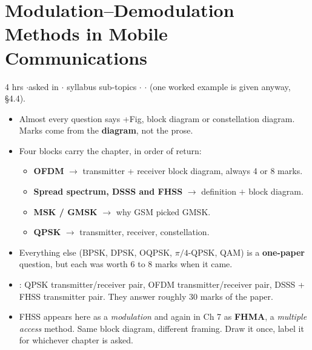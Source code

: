 \section{Modulation--Demodulation Methods in Mobile Communications}

{\color{sub}\footnotesize 4 hrs \gap$\cdot$\gap asked in 
\gap$\cdot$ syllabus sub-topics \gap$\cdot$\gap {} \gap$\cdot$\gap {} (one worked example is given anyway, \S4.4).}

\begin{itemize}
  \item {} Almost every question says +Fig, block diagram or
        constellation diagram. Marks come from the \textbf{diagram}, not the prose.
  \item Four blocks carry the chapter, in order of return:
  \begin{itemize}
    \item \textbf{OFDM}  $\rightarrow$ transmitter + receiver block diagram, always 4 or 8 marks.
    \item \textbf{Spread spectrum, DSSS and FHSS}  $\rightarrow$ definition $+$ block diagram.
    \item \textbf{MSK / GMSK}  $\rightarrow$ why GSM picked GMSK.
    \item \textbf{QPSK}  $\rightarrow$ transmitter, receiver, constellation.
  \end{itemize}
  \item Everything else (BPSK, DPSK, OQPSK, $\pi/4$-QPSK, QAM) is a \textbf{one-paper}
        question, but each was worth 6 to 8 marks when it came.
  \item {}: QPSK transmitter/receiver pair, OFDM transmitter/receiver
        pair, DSSS + FHSS transmitter pair. They answer roughly 30 marks of the paper.
  \item FHSS appears here as a \emph{modulation} and again in Ch 7 as \textbf{FHMA}, a
        \emph{multiple access} method. Same block diagram, different framing. Draw it once,
        label it for whichever chapter is asked.
\end{itemize}

